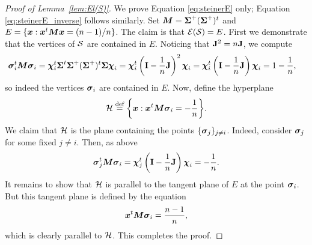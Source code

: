 \begin{proof}[Proof of Lemma~\ref{lem:El(S)}]
	We prove Equation  \eqref{eq:steinerE} only; Equation \eqref{eq:steinerE_inverse} follows similarly. 
	Set ${\vb*{M}}=\boldsymbol{\Sigma}^+(\boldsymbol{\Sigma}^+)^t$ and $E=\{\vb*{x}:\vb*{x}^t {\vb*{M}}\vb*{x}=(n-1)/n\}$. The claim is that $\mathcal{E}(\mathcal{S})=E$.  
	First we demonstrate that the vertices of $\mathcal{S}$ are contained in $E$. Noticing that $\vb{J}^2=n\vb{J}$, we compute 
	\begin{align*}
	\vb*{\sigma}_i^t {\vb*{M}} \vb*{\sigma}_i &= \boldsymbol{\chi}_i^t \boldsymbol{\Sigma}^t \boldsymbol{\Sigma}^+(\boldsymbol{\Sigma}^+)^t \boldsymbol{\Sigma} \boldsymbol{\chi}_i = \boldsymbol{\chi}_i^t \left(\vb{I}-\frac{1}{n}\vb{J}\right)^2 \boldsymbol{\chi}_i = \boldsymbol{\chi}_i^t \left(\vb{I}-\frac{1}{n}\vb{J}\right) \boldsymbol{\chi}_i = 1 - \frac{1}{n}, 
	\end{align*}
	so indeed the vertices $\vb*{\sigma}_i$ are contained in $E$. Now, define the hyperplane 
	\[\mathcal{H}\overset{\text{def}}{=} \bigg\{\vb*{x}:\vb*{x}^t {\vb*{M}} \vb*{\sigma}_i = -\frac{1}{n}\bigg\}.\]
	We claim that $\mathcal{H}$ is the plane containing the points $\{\vb*{\sigma}_j\}_{j\neq i}$. Indeed, consider $\vb*{\sigma}_j$ for some fixed $j\neq i$. Then, as above 
	\[\vb*{\sigma}_j^t {\vb*{M}}\vb*{\sigma}_i = \boldsymbol{\chi}_j^t \left(\vb{I}-\frac{1}{n}\vb{J}\right) \boldsymbol{\chi}_i = -\frac{1}{n}. \]
	It remains to show that $\mathcal{H}$ is parallel to the tangent plane of $E$ at the point $\vb*{\sigma}_i$. But this tangent plane is defined by the equation~\cite{fiedler2005geometry} 
	\[\vb*{x}^t {\vb*{M}}\vb*{\sigma}_i =\frac{n-1}{n},\]
	which is clearly parallel to $\mathcal{H}$. This completes the proof.
\end{proof}

